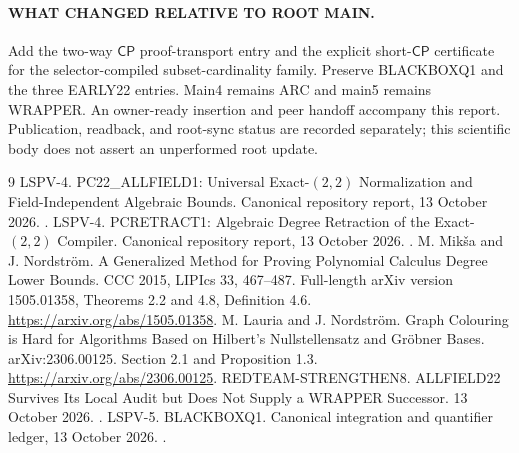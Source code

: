 \documentclass[11pt]{article}
\newcommand{\CP}{\mathsf{CP}}
\begin{document}
\paragraph{WHAT CHANGED RELATIVE TO ROOT MAIN.}
Add the two-way $\CP$ proof-transport entry and the explicit short-$\CP$
certificate for the selector-compiled subset-cardinality family. Preserve
BLACKBOXQ1 and the three EARLY22 entries. Main4 remains ARC and main5 remains
WRAPPER. An owner-ready insertion and peer handoff accompany this report.
Publication, readback, and root-sync status are recorded separately; this
scientific body does not assert an unperformed root update.

\begin{thebibliography}{9}
 LSPV-4. PC22\_ALLFIELD1: Universal Exact-$(2,2)$ Normalization
and Field-Independent Algebraic Bounds. Canonical repository report,
13 October 2026.
.
 LSPV-4. PCRETRACT1: Algebraic Degree Retraction of the
Exact-$(2,2)$ Compiler. Canonical repository report, 13 October 2026.
.
 M. Mik\v{s}a and J. Nordstr\"om.
A Generalized Method for Proving Polynomial Calculus Degree Lower Bounds.
CCC 2015, LIPIcs 33, 467--487. Full-length arXiv version 1505.01358,
Theorems 2.2 and 4.8, Definition 4.6.
\url{https://arxiv.org/abs/1505.01358}.
 M. Lauria and J. Nordstr\"om.
Graph Colouring is Hard for Algorithms Based on Hilbert's Nullstellensatz
and Gr\"obner Bases. arXiv:2306.00125. Section 2.1 and Proposition 1.3.
\url{https://arxiv.org/abs/2306.00125}.
 REDTEAM-STRENGTHEN8. ALLFIELD22 Survives Its Local Audit but
Does Not Supply a WRAPPER Successor. 13 October 2026.
.
 LSPV-5. BLACKBOXQ1. Canonical integration and
quantifier ledger, 13 October 2026.
.
\end{thebibliography}
\end{document}
